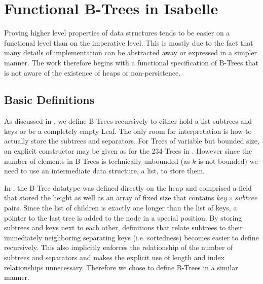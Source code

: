 

\chapter{Functional B-Trees in Isabelle}\label{chapter:abs-set}

Proving higher level properties of data structures
tends to be easier on a functional level than on the imperative
level.
This is mostly due to the fact that many details of implementation
can be abstracted away or expressed in a simpler manner.
The work therefore begins with a functional specification of B-Trees
that is not aware of the existence of heaps or non-persistence.

\section{Basic Definitions}
\label{sec:basic-defs}


As discussed in ,
we define B-Trees recursively to either hold a list
subtrees and keys or be a completely empty Leaf.
The only room for interpretation is how to actually
store the subtrees and separators.
For Trees of variable but bounded size,
an explicit constructor may be given as for the 234-Trees in \parencite{DBLP:conf/itp/Nipkow16}.
However since the number of elements in B-Trees
is technically unbounded (as $k$ is not bounded)
we need to use an intermediate data structure,
a list, to store them.

In \parencite{DBLP:conf/popl/MalechaMSW10},
the B-Tree datatype was defined directly on the heap
and comprised a field that stored the height as well
as an array of fixed size that contains $key \times subtree$ pairs.
Since the list of children is exactly one longer than the list of keys,
a pointer to the last tree is added to the node in a special position.
By storing subtrees and keys next to each other,
definitions that relate subtrees to their immediately
neighboring separating keys (i.e. sortedness) becomes easier to define recursively.
This also implicitly enforces the relationship of the number of subtrees
and separators and makes the explicit use of length and index relationships unnecessary.
Therefore we chose to define B-Trees in a similar manner.

